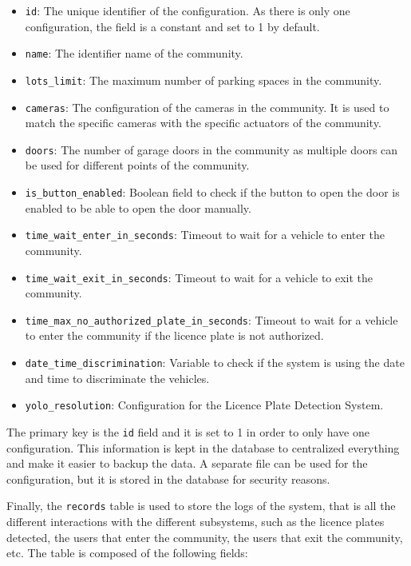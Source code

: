\begin{itemize}
	\item \texttt{id}: The unique identifier of the configuration. As there is only one configuration, the field is a constant and set to 1 by default.
	\item \texttt{name}: The identifier name of the community.
	\item \texttt{lots\_limit}: The maximum number of parking spaces in the community.
	\item \texttt{cameras}: The configuration of the cameras in the community. It is used to match the specific cameras with the specific actuators of the community.
	\item \texttt{doors}: The number of garage doors in the community as multiple doors can be used for different points of the community.
	\item \texttt{is\_button\_enabled}: Boolean field to check if the button to open the door is enabled to be able to open the door manually.
	\item \texttt{time\_wait\_enter\_in\_seconds}: Timeout to wait for a vehicle to enter the community.
	\item \texttt{time\_wait\_exit\_in\_seconds}: Timeout to wait for a vehicle to exit the community.
	\item \texttt{time\_max\_no\_authorized\_plate\_in\_seconds}: Timeout to wait for a vehicle to enter the community if the licence plate is not authorized.
	\item \texttt{date\_time\_discrimination}: Variable to check if the system is using the date and time to discriminate the vehicles.
	\item \texttt{yolo\_resolution}: Configuration for the Licence Plate Detection System.
\end{itemize}

The primary key is the \texttt{id} field and it is set to 1 in order to only have one configuration. This information is kept in the database to centralized everything and make it easier to backup the data. A separate file can be used for the configuration, but it is stored in the database for security reasons.

Finally, the \texttt{records} table is used to store the logs of the system, that is all the different interactions with the different subsystems, such as the licence plates detected, the users that enter the community, the users that exit the community, etc. The table is composed of the following fields:

